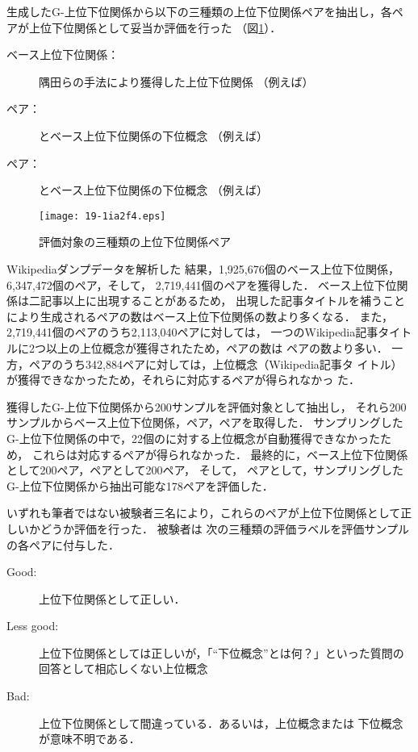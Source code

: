 \documentclass[japanese]{jnlp_1.4}
\newcommand{\thype}{}
\newcommand{\ghype}{}
\newcommand{\isa}[2]{}
\begin{document}
生成したG-上位下位関係から以下の三種類の上位下位関係ペアを抽出し，各ペアが上位下位関係として妥当か評価を行った
（図\ref{fig:hh-kinds}）．

\begin{description}
 \item[ベース上位下位関係：] 隅田らの手法により獲得した上位下位関係
	    （例えば\isa{作品}{七人の侍}）
 \item[\ghype{}ペア：] \ghype{}とベース上位下位関係の下位概念
	    （例えば\isa{映画監督の作品}{七人の侍}）
 \item[\thype{}ペア：] \thype{}とベース上位下位関係の下位概念
	    （例えば\isa{黒澤明の作品}{七人の侍}）
\end{description}

\begin{figure}[htb]
\begin{center}
\texttt{[image: 19-1ia2f4.eps]}
\end{center}
\caption{評価対象の三種類の上位下位関係ペア}
\label{fig:hh-kinds}
\end{figure}

Wikipediaダンプデータを解析した
結果，1,925,676個のベース上位下位関係，
6,347,472個の\ghype{}ペア，そして，
2,719,441個の\thype{}ペアを獲得した．
ベース上位下位関係は二記事以上に出現することがあるため，
出現した記事タイトルを補うことにより生成される\thype{}ペアの数はベース上位下位関係の数より多くなる．
また，2,719,441個の\thype{}ペアのうち2,113,040ペアに対しては，
一つのWikipedia記事タイトルに2つ以上の上位概念が獲得されたため，\ghype{}ペアの数は
\thype{}ペアの数より多い．
一方，\thype{}ペアのうち342,884ペアに対しては，上位概念（Wikipedia記事タ
イトル）が獲得できなかったため，それらに対応する\ghype{}ペアが得られなかっ
た．



獲得したG-上位下位関係から200サンプルを評価対象として抽出し，
それら200サンプルからベース上位下位関係，\thype{}ペア，\ghype{}ペアを取得した．
サンプリングしたG-上位下位関係の中で，22個の\thype{}に対する上位概念が自動獲得できなかったため，
これらは対応する\ghype{}ペアが得られなかった．
最終的に，ベース上位下位関係として200ペア，\thype{}ペアとして200ペア，
そして，
\ghype{}ペアとして，サンプリングしたG-上位下位関係から抽出可能な178ペアを評価した．



いずれも筆者ではない被験者三名により，これらのペアが上位下位関係として正しいかどうか評価を行った．
被験者は
次の三種類の評価ラベルを評価サンプルの各ペアに付与した．

\begin{description}
 \item[Good:] 上位下位関係として正しい．
 \item[Less good:] 上位下位関係としては正しいが，「``下位概念''とは何？」といった質問の回答として相応しくない上位概念
 \item[Bad:] 上位下位関係として間違っている．あるいは，上位概念または
	    下位概念が意味不明である．
\end{description}
\end{document}
